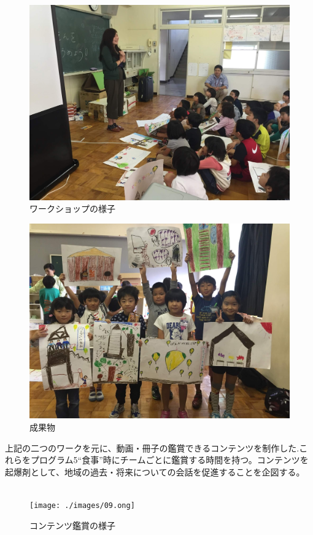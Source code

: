 \documentclass[a4paper]{jsarticle}
\begin{document}
\begin{figure}[H]
  \begin{center}
    \includegraphics[width=0.8\hsize]{./images/06.jpg}
    \caption{ワークショップの様子}
    \label{fig:tmu_hino}
  \end{center}
\end{figure}
\begin{figure}[H]
  \begin{center}
    \includegraphics[width=0.8\hsize]{./images/07.jpg}
    \caption{成果物}
    \label{fig:tmu_hino}
  \end{center}
\end{figure}
\par
上記の二つのワークを元に、動画・冊子の鑑賞できるコンテンツを制作した.これらをプログラム5“食事”時にチームごとに鑑賞する時間を持つ。コンテンツを起爆剤として、地域の過去・将来についての会話を促進することを企図する。\\\\
\begin{figure}[H]
  \begin{center}
    \texttt{[image: ./images/09.ong]}
    \caption{コンテンツ鑑賞の様子}
    \label{fig:tmu_hino}
  \end{center}
\end{figure}
\end{document}

